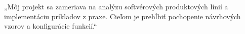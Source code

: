 „Môj projekt sa zameriava na analýzu softvérových produktových línií a implementáciu príkladov z praxe. Cieľom je prehĺbiť pochopenie návrhových vzorov a konfigurácie funkcií.“